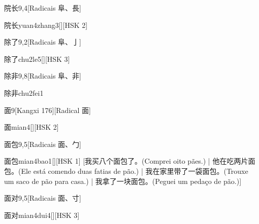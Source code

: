\begin{entry}{院长}{9,4}[Radicais ⾩、⾧]
  \begin{phonetics}{院长}{yuan4zhang3}[][HSK 2]
  \end{phonetics}
\end{entry}

\begin{entry}{除了}{9,2}[Radicais ⾩、⼅]
  \begin{phonetics}{除了}{chu2le5}[][HSK 3]
  \end{phonetics}
\end{entry}

\begin{entry}{除非}{9,8}[Radicais ⾩、⾮]
  \begin{phonetics}{除非}{chu2fei1}
  \end{phonetics}
\end{entry}

\begin{entry}{面}{9}[Kangxi 176][Radical ⾯]
  \begin{phonetics}{面}{mian4}[][HSK 2]
  \end{phonetics}
\end{entry}

\begin{entry}{面包}{9,5}[Radicais ⾯、⼓]
  \begin{phonetics}{面包}{mian4bao1}[][HSK 1]
    [我买八个面包了。(Comprei oito pães.) | 他在吃两片面包。(Ele está comendo duas fatias de pão.) | 我在家里带了一袋面包。(Trouxe um saco de pão para casa.) | 我拿了一块面包。(Peguei um pedaço de pão.)]
  \end{phonetics}
\end{entry}

\begin{entry}{面对}{9,5}[Radicais ⾯、⼨]
  \begin{phonetics}{面对}{mian4dui4}[][HSK 3]
  \end{phonetics}
\end{entry}

